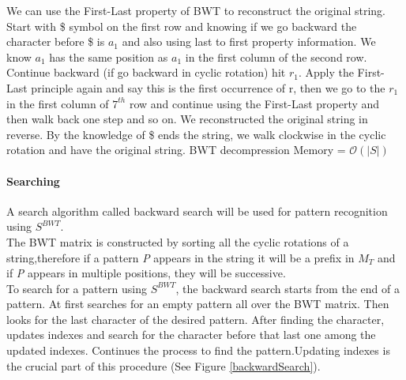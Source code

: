 \documentclass[11pt,a4paper]{report}
\begin{document}
We can use the First-Last property of BWT to reconstruct the original 
string. Start with \$ symbol on the first row and knowing if we go backward the 
character before \$ is $a_1$ and also using last to first property 
information. We know  $a_1$ has the same position as $a_1$ in the first 
column of the second row. Continue backward (if go backward in cyclic 
rotation) hit $r_1$. Apply the First-Last principle again and say this is 
the first occurrence of r, then we go to the  $r_1$ in the first column of 
$7^{th}$ row and continue using the First-Last property and then walk back 
one step and so on. We reconstructed the original string in reverse. By the 
knowledge of \$ ends the string, we walk clockwise in the cyclic rotation 
and have the original string.
BWT decompression Memory =  $\mathcal{O}(\lvert S \rvert)$ \\



\paragraph{Searching}
A search algorithm called backward search will be used for pattern recognition using $S^{BWT}$.\\

The BWT matrix is constructed by sorting all the cyclic rotations of a string,therefore
if a pattern \emph{P} appears in the string it will be a prefix in $M_{T}$ and if \emph {P} 
appears in multiple positions, they will be successive.\\ 
To search for a pattern using $S^{BWT}$, the backward search starts from the end of a pattern.
At first searches for an empty  pattern all over the BWT matrix. Then looks for the 
last character of the desired pattern. After finding the character, updates indexes and 
search for the character before that last one among the updated indexes.
Continues the process to find the pattern.Updating indexes is the crucial part of this procedure (See Figure \ref{backwardSearch}).\\\\
\end{document}
